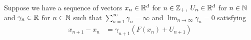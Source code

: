 \begin{defn}Suppose we have a sequence of vectors $x_n \in \mathbb{R}^d$ for $n \in \mathbb{Z}_+$, $U_n \in \mathbb{R}^d$ for $n \in \mathbb{N}$ and $\gamma_n \in \mathbb{R}$ for $n \in \mathbb{N}$ such that $\sum_{n=1}^\infty \gamma_n = \infty$ and $\lim_{n \to \infty} \gamma_n = 0$ satisfying
\begin{align*}
x_{n+1} - x_n &= \gamma_{n+1} ( F(x_n) + U_{n+1})
\end{align*}
\end{defn} 